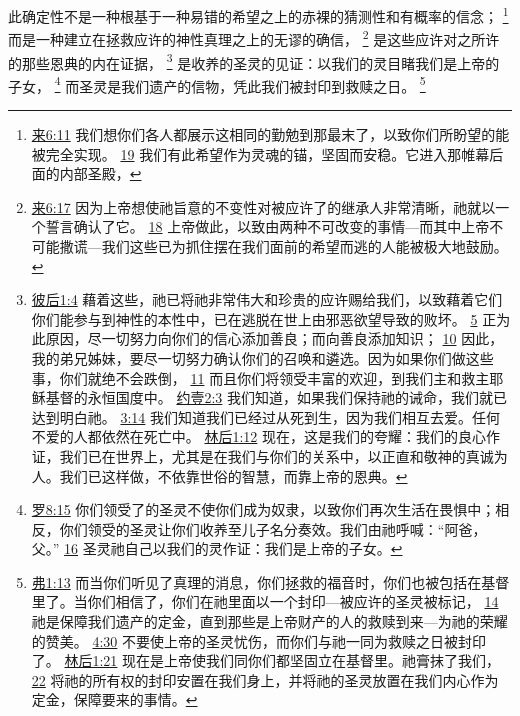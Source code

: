\documentclass[12pt, a4paper, oneside]{ctexart}
\newcounter{parnum}[section]
\newcommand{\N}{%
   \noindent\refstepcounter{parnum}%
    \makebox[\parindent][l]{\textbf{\arabic{parnum}.}}}
\begin{document}
\N 此确定性不是一种根基于一种易错的希望之上的赤裸的猜测性和有概率的信念；
	\footnote {
		\href{https://biblehub.com/hebrews/6-11.htm}{来6:11} 我们想你们各人都展示这相同的勤勉到那最末了，以致你们所盼望的能被完全实现。
		\href{https://biblehub.com/hebrews/6-19.htm}{19} 我们有此希望作为灵魂的锚，坚固而安稳。它进入那帷幕后面的内部圣殿，
	}
	而是一种建立在拯救应许的神性真理之上的无谬的确信，
	\footnote {
		\href{https://biblehub.com/hebrews/6-17.htm}{来6:17} 因为上帝想使祂旨意的不变性对被应许了的继承人非常清晰，祂就以一个誓言确认了它。
		\href{https://biblehub.com/hebrews/6-18.htm}{18} 上帝做此，以致由两种不可改变的事情---而其中上帝不可能撒谎---我们这些已为抓住摆在我们面前的希望而逃的人能被极大地鼓励。
	}
	是这些应许对之所许的那些恩典的内在证据，
	\footnote {
		\href{https://biblehub.com/2_peter/1-4.htm}{彼后1:4} 藉着这些，祂已将祂非常伟大和珍贵的应许赐给我们，以致藉着它们你们能参与到神性的本性中，已在逃脱在世上由邪恶欲望导致的败坏。
		\href{https://biblehub.com/2_peter/1-5.htm}{5} 正为此原因，尽一切努力向你们的信心添加善良；而向善良添加知识；
		\href{https://biblehub.com/2_peter/1-10.htm}{10} 因此，我的弟兄姊妹，要尽一切努力确认你们的召唤和遴选。因为如果你们做这些事，你们就绝不会跌倒，
		\href{https://biblehub.com/2_peter/1-11.htm}{11} 而且你们将领受丰富的欢迎，到我们主和救主耶稣基督的永恒国度中。
		\href{https://biblehub.com/1_john/2-3.htm}{约壹2:3} 我们知道，如果我们保持祂的诫命，我们就已达到明白祂。
		\href{https://biblehub.com/1_john/3-14.htm}{3:14} 我们知道我们已经过从死到生，因为我们相互去爱。任何不爱的人都依然在死亡中。
		\href{https://biblehub.com/2_corinthians/1-12.htm}{林后1:12} 现在，这是我们的夸耀：我们的良心作证，我们已在世界上，尤其是在我们与你们的关系中，以正直和敬神的真诚为人。我们已这样做，不依靠世俗的智慧，而靠上帝的恩典。
	}
	是收养的圣灵的见证：以我们的灵目睹我们是上帝的子女，
	\footnote {
		\href{https://biblehub.com/romans/8-15.htm}{罗8:15} 你们领受了的圣灵不使你们成为奴隶，以致你们再次生活在畏惧中；相反，你们领受的圣灵让你们收养至儿子名分奏效。我们由祂呼喊：“阿爸，父。”
		\href{https://biblehub.com/romans/8-16.htm}{16} 圣灵祂自己以我们的灵作证：我们是上帝的子女。
	}
	而圣灵是我们遗产的信物，凭此我们被封印到救赎之日。
	\footnote {
		\href{https://biblehub.com/ephesians/1-13.htm}{弗1:13} 而当你们听见了真理的消息，你们拯救的福音时，你们也被包括在基督里了。当你们相信了，你们在祂里面以一个封印---被应许的圣灵被标记，
		\href{https://biblehub.com/ephesians/1-14.htm}{14} 祂是保障我们遗产的定金，直到那些是上帝财产的人的救赎到来---为祂的荣耀的赞美。
		\href{https://biblehub.com/ephesians/4-30.htm}{4:30} 不要使上帝的圣灵忧伤，而你们与祂一同为救赎之日被封印了。
		\href{https://biblehub.com/2_corinthians/1-21.htm}{林后1:21} 现在是上帝使我们同你们都坚固立在基督里。祂膏抹了我们，
		\href{https://biblehub.com/2_corinthians/1-22.htm}{22} 将祂的所有权的封印安置在我们身上，并将祂的圣灵放置在我们内心作为定金，保障要来的事情。
	}
\end{document}
